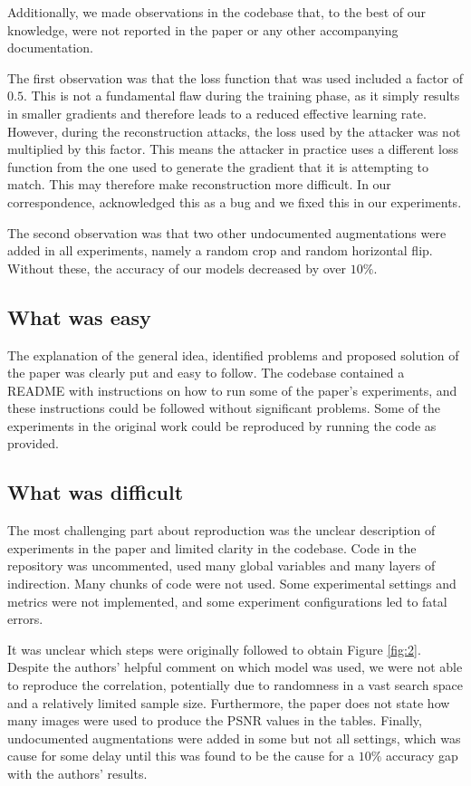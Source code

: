 Additionally, we made observations in the codebase that, to the best of our knowledge, were not reported in the paper or any other accompanying documentation.

The first observation was that the loss function that was used included a factor of $0.5$. This is not a fundamental flaw during the training phase, as it simply results in smaller gradients and therefore leads to a reduced effective learning rate. However, during the reconstruction attacks, the loss used by the attacker was not multiplied by this factor. This means the attacker in practice uses a different loss function from the one used to generate the gradient that it is attempting to match. This may therefore make reconstruction more difficult. In our correspondence, \citet{gao2021privacy} acknowledged this as a bug and we fixed this in our experiments.

The second observation was that two other undocumented augmentations were added in all experiments, namely a random crop and random horizontal flip. Without these, the accuracy of our models decreased by over $10\%$.

\subsection{What was easy}

The explanation of the general idea, identified problems and proposed solution of the paper was clearly put and easy to follow. The codebase contained a README with instructions on how to run some of the paper's experiments, and these instructions could be followed without significant problems. Some of the experiments in the original work could be reproduced by running the code as provided.

\subsection{What was difficult}

The most challenging part about reproduction was the unclear description of experiments in the paper and limited clarity in the codebase. Code in the repository was uncommented, used many global variables and many layers of indirection. Many chunks of code were not used. Some experimental settings and metrics were not implemented, and some experiment configurations led to fatal errors.

It was unclear which steps were originally followed to obtain Figure \ref{fig:2}. Despite the authors' helpful comment on which model was used, we were not able to reproduce the correlation, potentially due to randomness in a vast search space and a relatively limited sample size. Furthermore, the paper does not state how many images were used to produce the PSNR values in the tables. Finally, undocumented augmentations were added in some but not all settings, which was cause for some delay until this was found to be the cause for a $10\%$ accuracy gap with the authors' results.

